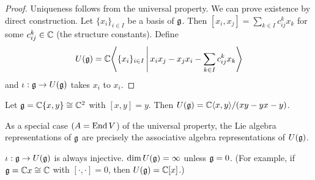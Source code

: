 \begin{proof}
  Uniqueness follows from the universal property.
  We can prove existence by direct construction.
  Let $\{x_i\}_{i \in I}$ be a basis of $\mathfrak{g}$.
  Then $[x_i,x_j] = \sum_{k \in I} c_{ij}^k x_k$ for some $c_{ij}^k \in \mathbb{C}$ (the structure constants).
  Define
  \[ U(\mathfrak{g}) = \mathbb{C}{\left\langle \{x_i\}_{i \in I} \, \Bigg\vert \, x_ix_j-x_jx_i-\sum_{k \in I} c_{ij}^k x_k \right\rangle} \]
  and $\iota: \mathfrak{g} \to U(\mathfrak{g})$ takes $x_i$ to $x_i$.
\end{proof}

\begin{exam}
  Let $\mathfrak{g} = \mathbb{C}\{x,y\} \cong \mathbb{C}^2$ with $[x,y]=y$.
  Then $U(\mathfrak{g}) = \mathbb{C}{\left\langle x,y \right\rangle}/(xy-yx-y)$.
\end{exam}

\begin{rmk}
  As a special case $(A=\operatorname{End} V$) of the universal property, the Lie algebra representations of $\mathfrak{g}$ are precisely the associative algebra representations of $U(\mathfrak{g})$.
\end{rmk}

\begin{rmk}
  \lv
  \begin{enum}
    \io $\iota: \mathfrak{g} \to U(\mathfrak{g})$ is always injective.
    \io $\dim U(\mathfrak{g})=\infty$ unless $\mathfrak{g}=0$.
    (For example, if $\mathfrak{g} = \mathbb{C} x \cong \mathbb{C}$ with $[\cdot,\cdot]=0$, then $U(\mathfrak{g})=\mathbb{C}[x]$.)
  \end{enum}
\end{rmk}

